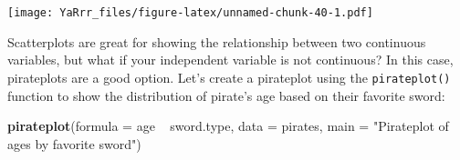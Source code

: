 \documentclass[]{book}
\newenvironment{Shaded}{\begin{snugshade}}{\end{snugshade}}
\newcommand{\KeywordTok}[1]{\textcolor[rgb]{0.13,0.29,0.53}{\textbf{{#1}}}}
\newcommand{\DataTypeTok}[1]{\textcolor[rgb]{0.13,0.29,0.53}{{#1}}}
\newcommand{\DecValTok}[1]{\textcolor[rgb]{0.00,0.00,0.81}{{#1}}}
\newcommand{\StringTok}[1]{\textcolor[rgb]{0.31,0.60,0.02}{{#1}}}
\newcommand{\CommentTok}[1]{\textcolor[rgb]{0.56,0.35,0.01}{\textit{{#1}}}}
\newcommand{\NormalTok}[1]{{#1}}
\theoremstyle{definition}
\theoremstyle{definition}
\theoremstyle{remark}
\begin{document}
\begin{Shaded}
\end{Shaded}

\texttt{[image: YaRrr\_files/figure-latex/unnamed-chunk-40-1.pdf]}

Scatterplots are great for showing the relationship between two
continuous variables, but what if your independent variable is not
continuous? In this case, pirateplots are a good option. Let's create a
pirateplot using the \texttt{pirateplot()} function to show the
distribution of pirate's age based on their favorite sword:

\begin{Shaded}
\begin{Highlighting}[]
\KeywordTok{pirateplot}\NormalTok{(}\DataTypeTok{formula =} \NormalTok{age ~}\StringTok{ }\NormalTok{sword.type, }
           \DataTypeTok{data =} \NormalTok{pirates,}
           \DataTypeTok{main =} \StringTok{"Pirateplot of ages by favorite sword"}\NormalTok{)}
\end{Highlighting}
\end{Shaded}
\end{document}
